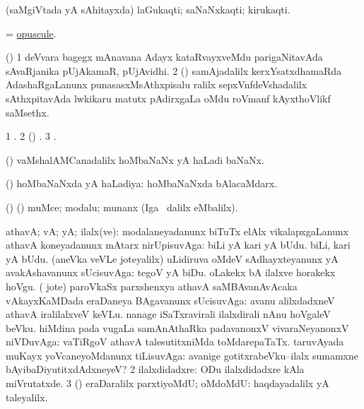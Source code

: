 \bentry
{}
\gl{\nA}
\bmng
(saMgiVtada yA sAhitayxda) laGukaqti; saNaNxkaqti; kirukaqti. 
\emng
\eentry

\bentry
{}
\gl{\nA}
\bmng
= \hyperlink{opuscule}{opuscule}. 
\emng
\eentry

\bentry
{}
\gl{\nA}
\bmng
(\kerxY) 
\bnum
\num{1} deVvara bagegx mAnavana Adayx kataRvayxveMdu parigaNitavAda sAvaRjanika pUjAkamaR, pUjAvidhi. 
\num{2} () samAjadalilx kerxYsatxdhamaRda AdashaRgaLanunx punasasxMsAthxpisalu ralilx sepxVnfdeVshadalilx sAthxpitavAda lwkikaru matutx pAdirxgaLa oMdu roVmanf kAyxthoVlikf saMsethx. 
\enum
\emng
\eentry

\bentry
{}
\gl{\saMkiSx}
\bmng
\bnum
\num{1} . 
\num{2} (\ame) . 
\num{3} . 
\enum
\emng
\eentry

\bentry
{}
\gl{\nA}
\bmng
(\vaMlAM) vaMshalAMCanadalilx hoMbaNaNx yA haLadi baNaNx. 
\emng
\eentry

\bentry
{}
\gl{\gu}
\bmng
(\vaMlAM) hoMbaNaNxda yA haLadiya:  hoMbaNaNxda bAlacaMdarx. 
\emng
\eentry

\bentry
{}
\gl{\upa}
\bmng
(\birx) (\pArxparx) muMce; modalu; munanx (Iga \kanmu\ \kAparx dalilx  eMbalilx). 
\emng
\eentry

\bentry
{}
\gl{\saMavayx}
\bmng
\bnum
{} athavA; vA; yA; ilalx(ve): 
\banum
{} modalaneyadanunx biTuTx elAlx vikalapxgaLanunx athavA koneyadanunx mAtarx nirUpisuvAga:  biLi yA kari yA bUdu.  biLi, kari yA bUdu. 
 (aneVka veVLe  joteyalilx) uLidiruva oMdeV sAdhayxteyanunx yA avakAshavanunx sUcisuvAga:  tegoV yA biDu.  oLakekx bA ilalxve horakekx hoVgu. 
 ( jote) paroVkaSx parxshenxya athavA saMBAvanAvAcaka vAkayxKaMDada eraDaneya BAgavanunx sUcisuvAga:  avanu alilxdadxneV athavA iralilalxveV keVLu.  nanage iSaTxravirali ilalxdirali nAnu hoVgaleV beVku. 
 hiMdina pada \mo vugaLa samAnAthaRka padavanonxV vivaraNeyanonxV niVDuvAga:  vaTiRgoV athavA talesutitxniMda toMdarepaTaTx. 
 taruvAyada muKayx yoVcaneyoMdanunx tiLisuvAga:  avanige gotitxrabeVku--ilalx sumamxne bAyibaDiyutitxdAdxneyeV? 
\eanum
\numie
\num{2} ilalxdidadxre:  ODu ilalxdidadxre kAla miVrutatxde. 
\num{3} (\kAparx) eraDaralilx parxtiyoMdU; oMdoMdU:  haqdayadalilx yA taleyalilx. 
\enum
\emng

